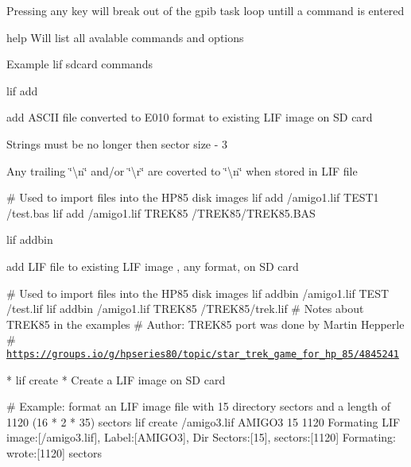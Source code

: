 \begin{DoxyItemize}
\item Pressing any key will break out of the gpib task loop untill a command is entered
\begin{DoxyItemize}
\item help Will list all avalable commands and options
\item Example lif sdcard commands
\begin{DoxyItemize}
\item lif add
\begin{DoxyItemize}
\item add A\+S\+C\+II file converted to E010 format to existing L\+IF image on SD card
\item Strings must be no longer then sector size -\/ 3
\item Any trailing \char`\"{}\textbackslash{}n\char`\"{} and/or \char`\"{}\textbackslash{}r\char`\"{} are coverted to \char`\"{}\textbackslash{}n\char`\"{} when stored in L\+IF file 
\begin{DoxyPre}
         \# Used to import files into the HP85 disk images
         lif add /amigo1.lif TEST1 /test.bas
         lif add /amigo1.lif TREK85 /TREK85/TREK85.BAS
      \end{DoxyPre}

\end{DoxyItemize}
\item lif addbin
\begin{DoxyItemize}
\item add L\+IF file to existing L\+IF image , any format, on SD card 
\begin{DoxyPre}
         \# Used to import files into the HP85 disk images
         lif addbin /amigo1.lif TEST /test.lif
         lif addbin /amigo1.lif TREK85 /TREK85/trek.lif
            \# Notes about TREK85 in the examples
            \# Author: TREK85 port was done by Martin Hepperle
            \# \href{https://groups.io/g/hpseries80/topic/star_trek_game_for_hp_85/4845241}{\tt https://groups.io/g/hpseries80/topic/star\_trek\_game\_for\_hp\_85/4845241}\end{DoxyPre}

\end{DoxyItemize}
\end{DoxyItemize}


\begin{DoxyPre}      * lif create
         * Create a LIF image  on SD card
      
\begin{DoxyPre}
         \# Example: format an LIF image file with 15 directory sectors and a length of 1120 (16 * 2 * 35) sectors
         lif create /amigo3.lif AMIGO3 15 1120
         Formating LIF image:[/amigo3.lif], Label:[AMIGO3], Dir Sectors:[15], sectors:[1120]
         Formating: wrote:[1120] sectors
      \end{DoxyPre}


\end{DoxyPre}
\end{DoxyItemize}
\end{DoxyItemize}
